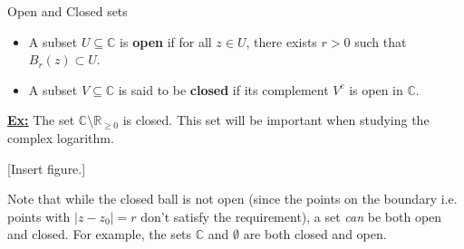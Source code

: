 \documentclass{article}
\newcommand{\R}{\mathbb{R}}
\newcommand{\C}{\mathbb{C}}
\begin{document}
\vskip 0.5cm
\begin{mathdefinitionbox}{Open and Closed sets}
\vskip 0.5cm
  \begin{itemize}
    \item A subset $U \subseteq \C$ is \textbf{open} if for all $z \in U$, there exists $r > 0$ such that $B_r (z) \subset U$.
    
    \item A subset $V \subseteq \C$ is said to be \textbf{closed} if its complement $V^c$ is open in $\C$.
  \end{itemize}
\end{mathdefinitionbox}



\vskip 0.5cm
\underline{\textbf{Ex:}} The set $\C \setminus \R_{\geq 0}$ is closed. This set will be important when studying the complex logarithm.


[Insert figure.]

\vskip 0.5cm
Note that while the closed ball is not open (since the points on the boundary i.e. points with $|z - z_0| = r$ don't satisfy the requirement), a set \emph{can} be both open and closed. For example, the sets $\C$ and $\emptyset$ are both closed and open.

\end{document}
